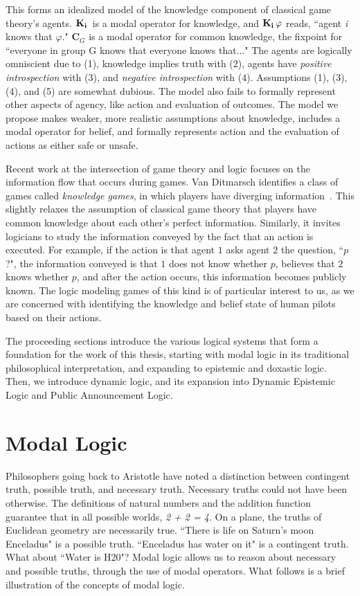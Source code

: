 This forms an idealized model of the knowledge component of classical game theory's agents. $\mathbf{K}_{\mathbf{i}}\,$ is a modal operator for knowledge, and $\mathbf{K}_{\mathbf{i}}\,\varphi$ reads, ``agent \emph{i} knows that $\varphi$." $\mathbf{C}_G$ is a modal operator for common knowledge, the fixpoint for ``everyone in group G knows that everyone knows that..." The agents are logically omniscient due to (1), knowledge implies truth with (2), agents have \emph{positive introspection} with (3), and \emph{negative introspection} with (4). Assumptions (1), (3), (4), and (5) are somewhat dubious. The model also fails to formally represent other aspects of agency, like action and evaluation of outcomes. The model we propose makes weaker, more realistic assumptions about knowledge, includes a modal operator for belief, and formally represents action and the evaluation of actions as either safe or unsafe.

Recent work at the intersection of game theory and logic focuses on the information flow that occurs during games. Van Ditmarsch identifies a class of games called \emph{knowledge games}, in which players have diverging information~\cite{ditmarsch}. This slightly relaxes the assumption of classical game theory that players have common knowledge about each other's perfect information. Similarly, it invites logicians to study the information conveyed by the fact that an action is executed. For example, if the action is that agent $1$ asks agent $2$ the question, ``$p$?", the information conveyed is that $1$ does not know whether $p$, believes that $2$ knows whether $p$, and after the action occurs, this information becomes publicly known. The logic modeling games of this kind is of particular interest to us, as we are concerned with identifying the knowledge and belief state of human pilots based on their actions. 

The proceeding sections introduce the various logical systems that form a foundation for the work of this thesis, starting with modal logic in its traditional philosophical interpretation, and expanding to epistemic and doxastic logic. Then, we introduce dynamic logic, and its expansion into Dynamic Epistemic Logic and Public Announcement Logic.

\section{Modal Logic}\label{sec:logic_foundation}
Philosophers going back to Aristotle have noted a distinction between contingent truth, possible truth, and necessary truth. Necessary truths could not have been otherwise. The definitions of natural numbers and the addition function guarantee that in all possible worlds, \emph{2 + 2 = 4}. On a plane, the truths of Euclidean geometry are necessarily true. ``There is life on Saturn's moon Enceladus" is a possible truth. ``Enceladus has water on it" is a contingent truth. What about ``Water is H20"? Modal logic allows us to reason about necessary and possible truths, through the use of modal operators. What follows is a brief illustration of the concepts of modal logic.

